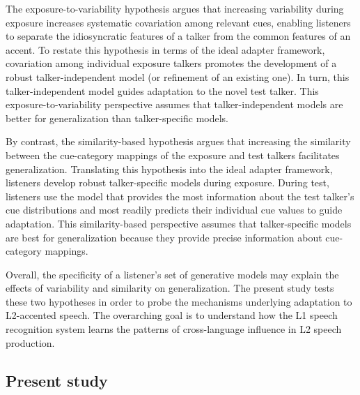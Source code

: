 \documentclass[preprint, 3p, authoryear]{elsarticle} %
\begin{document}
The exposure-to-variability hypothesis argues that increasing variability during exposure increases systematic covariation among relevant cues, enabling listeners to separate the idiosyncratic features of a talker from the common features of an accent.
To restate this hypothesis in terms of the ideal adapter framework, covariation among individual exposure talkers promotes the development of a robust talker-independent model (or refinement of an existing one).
In turn, this talker-independent model guides adaptation to the novel test talker.
This exposure-to-variability perspective assumes that talker-independent models are better for generalization than talker-specific models.

By contrast, the similarity-based hypothesis argues that increasing the similarity between the cue-category mappings of the exposure and test talkers facilitates generalization.
Translating this hypothesis into the ideal adapter framework, listeners develop robust talker-specific models during exposure.
During test, listeners use the model that provides the most information about the test talker's cue distributions and most readily predicts their individual cue values to guide adaptation.
This similarity-based perspective assumes that talker-specific models are best for generalization because they provide precise information about cue-category mappings.

Overall, the specificity of a listener's set of generative models may explain the effects of variability and similarity on generalization.
The present study tests these two hypotheses in order to probe the mechanisms underlying adaptation to L2-accented speech.
The overarching goal is to understand how the L1 speech recognition system learns the patterns of cross-language influence in L2 speech production.

\hypertarget{present-study}{%
\subsection{Present study}\label{present-study}}
\end{document}
